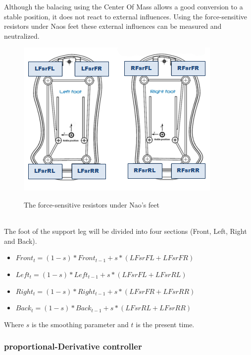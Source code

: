 \documentclass[a4paper]{article}
\begin{document}
Although the balacing using the Center Of Mass allows a good conversion to a
stable position, it does not react to external influences.
Using the force-sensitive resistors under Naos feet these external influences can be measured and neutralized.
\begin{figure}[htb]
	\centering
	\includegraphics[scale=0.75]{pics/naosfeet.jpg}
	\label{fig:fsr_plot}
	\caption{The force-sensitive resistors under Nao's feet}
\end{figure}\\
The foot of the support leg will be divided into four sections (Front, Left, Right and Back). 
\begin{itemize}
    \item $Front_t = (1-s) * Front_{t-1} + s * (LFsrFL + LFsrFR)$
    \item $Left_t = (1-s) * Left_{t-1} + s *(LFsrFL + LFsrRL)$
    \item $Right_t = (1-s) * Right_{t-1} + s *(LFsrFR + LFsrRR)$
    \item $Back_t = (1-s) * Back_{t-1} + s *(LFsrRL + LFsrRR)$ 
\end{itemize}
Where $s$ is the smoothing parameter and $t$ is the present time.

\subsubsection{proportional-Derivative controller}
\end{document}
